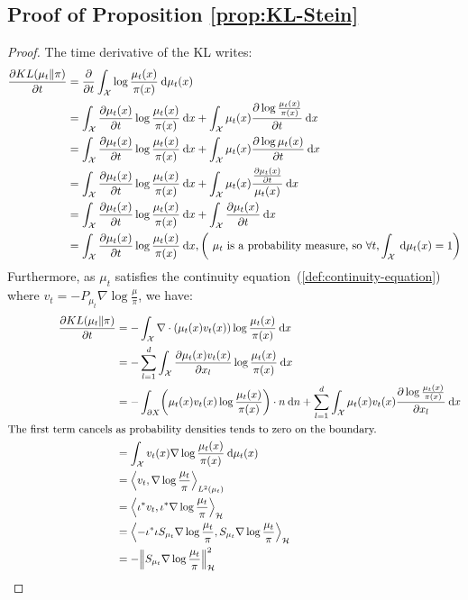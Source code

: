 \documentclass[runningheads,a4paper]{llncs}
\newcommand{\X}{\mathcal{X}}
\renewcommand{\H}{\mathcal{H}}
\newcommand{\diff}[2]{\frac{\partial #1}{\partial #2}}
\renewcommand{\d}{\: \mathrm{d}}
\DeclarePairedDelimiter{\norm}{\|}{\|}
\DeclarePairedDelimiter{\pare}{(}{)}
\DeclarePairedDelimiter{\sca}{\langle}{\rangle}
\begin{document}
\subsection{Proof of Proposition \ref{prop:KL-Stein}}\label{pro:KL-Stein}
\begin{proof}
  The time derivative of the KL writes:
  \begin{align*}
    \diff{KL(\mu_t \| \pi)}{t} &= \diff{ }{t} \int_\X \log \frac{\mu_t(x)}{\pi(x)} \d \mu_t(x) \\
    &= \int_\X \diff{\mu_t(x)}{t} \log \frac{\mu_t(x)}{\pi(x)} \d x
      + \int_\X \mu_t(x) \diff{\log \frac{\mu_t(x)}{\pi(x)}}{t} \d x \\
    &= \int_\X \diff{\mu_t(x)}{t} \log \frac{\mu_t(x)}{\pi(x)} \d x
      + \int_\X \mu_t(x) \diff{\log \mu_t(x)}{t} \d x \\
    &= \int_\X \diff{\mu_t(x)}{t} \log \frac{\mu_t(x)}{\pi(x)} \d x
      + \int_\X \mu_t(x) \frac{\diff{\mu_t(x)}{t}}{\mu_t(x)} \d x \\
    &= \int_\X \diff{\mu_t(x)}{t} \log \frac{\mu_t(x)}{\pi(x)} \d x
      + \int_\X \diff{\mu_t(x)}{t} \d x \\
    &= \int_\X \diff{\mu_t(x)}{t} \log \frac{\mu_t(x)}{\pi(x)} \d x
   , \pare*{\text{ $\mu_t$ is a probability measure, so } \forall t, \int_\X \d \mu_t(x) = 1}
  \end{align*}
  Furthermore, as $\mu_t$ satisfies the continuity equation~(\eqref{def:continuity-equation})
  where $v_t = -P_{\mu_t} \nabla \log \frac{\mu}{\pi}$, we have:
  \begin{align*}
    \diff{KL(\mu_t \| \pi)}{t} &= -\int_\X \nabla \cdot (\mu_t(x) v_t(x)) \log \frac{\mu_t(x)}{\pi(x)} \d x \\
    &= -\sum_{l=1}^d \int_\X \diff{\mu_t(x) v_t(x)}{x_l} \log \frac{\mu_t(x)}{\pi(x)} \d x \\
    &= -\int_{\partial X} \pare* {\mu_t(x) v_t(x) \log \frac{\mu_t(x)}{\pi(x)}} \cdot n \d n
      + \sum_{l=1}^d \int_\X \mu_t(x) v_t(x) \diff{\log \frac{\mu_t(x)}{\pi(x)}}{x_l} \d x \\
    \text{The first term cancels }& \text{as probability densities tends to zero on the boundary.} \\
    &= \int_\X v_t(x) \nabla \log \frac{\mu_t(x)}{\pi(x)} \d \mu_t(x) \\
    &= \sca*{v_t, \nabla \log \frac{\mu_t}{\pi}}_{L^2(\mu_t)} \\
    &= \sca*{\iota^* v_t, \iota^* \nabla \log \frac{\mu_t}{\pi}}_{\H} \\
    &= \sca*{-\iota^* \iota S_{\mu_t} \nabla \log \frac{\mu_t}{\pi}, S_{\mu_t} \nabla \log \frac{\mu_t}{\pi}}_{\H} \\
    &= -\norm*{S_{\mu_t} \nabla \log \frac{\mu_t}{\pi}}_\H^2
  \end{align*}
\end{proof}
\end{document}
